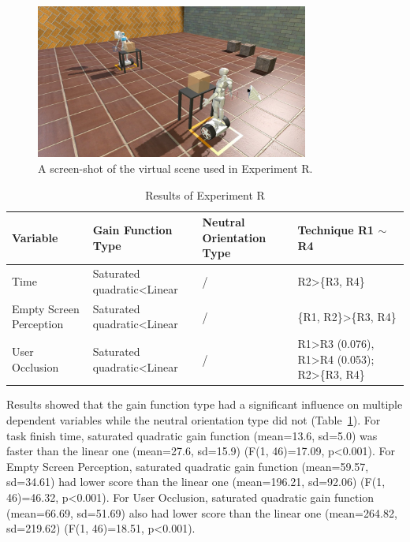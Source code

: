 \begin{figure}[tb]
  \centering
  \includegraphics[width=0.8\textwidth]{figures/ch4/t2}
  \caption{\label{fig:4_task2}A screen-shot of the virtual scene used in Experiment R.}
\end{figure}

\begin{table}[!t]
\renewcommand{\arraystretch}{1.3}
\caption{Results of Experiment R}
\label{tab:4_result_t2}
\centering
\begin{tabular}{l l l l}
  \hline
  Variable & Gain Function Type & Neutral Orientation Type & Technique R1 $\sim$ R4 \\
  \hline
  Time & Saturated quadratic\textless Linear & / & R2\textgreater \{R3, R4\} \\
  Empty Screen Perception & Saturated quadratic\textless Linear & / & \{R1, R2\}\textgreater\{R3, R4\} \\
  User Occlusion & Saturated quadratic\textless Linear & / & R1\textgreater R3 (0.076), R1\textgreater R4 (0.053); R2\textgreater \{R3, R4\} \\
  \hline
\end{tabular}
\end{table}

Results showed that the gain function type had a significant influence on multiple dependent variables while the neutral orientation type did not (Table~\ref{tab:4_result_t2}). For task finish time, saturated quadratic gain function (mean=13.6, sd=5.0) was faster than the linear one (mean=27.6, sd=15.9) (F(1, 46)=17.09, p\textless 0.001). For Empty Screen Perception, saturated quadratic gain function (mean=59.57, sd=34.61) had lower score than the linear one (mean=196.21, sd=92.06) (F(1, 46)=46.32, p\textless 0.001). For User Occlusion, saturated quadratic gain function (mean=66.69, sd=51.69) also had lower score than the linear one (mean=264.82, sd=219.62) (F(1, 46)=18.51, p\textless 0.001).


